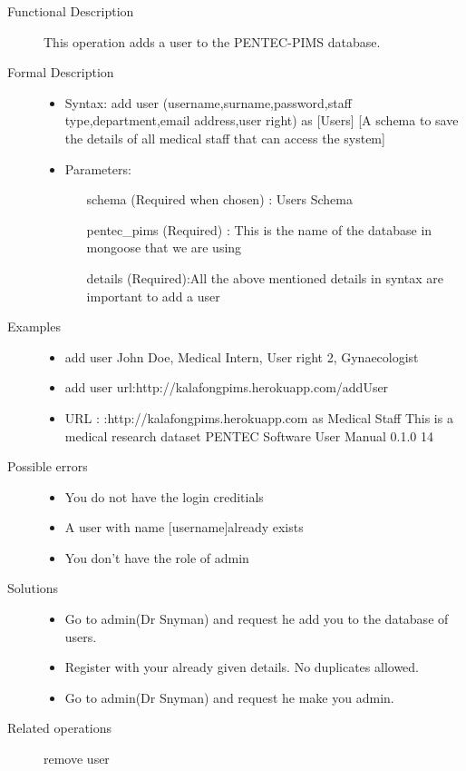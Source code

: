 \documentclass[14pt, a4paper]{article}
\begin{document}
\begin{description}
\item [Functional Description] This operation adds a user to the PENTEC-PIMS database.
\item [Formal Description] \hfill
\begin{itemize}
	\item Syntax: add user (username,surname,password,staff type,department,email address,user right) as [Users] [A schema to save the details of all medical staff that can access the system]\\
	\item Parameters:
		\begin{itemize}
			\item [schema] (Required when chosen) : Users Schema\\
			\item [pentec\_pims] (Required) : This is the name of the database in mongoose that we are using\\
			\item [details](Required):All the above mentioned details in syntax are important to add a user\\
		 \end{itemize}
\end{itemize}
\item[Examples]\hfill
\begin{itemize}
	\item add user John Doe, Medical Intern, User right 2, Gynaecologist
	\item add user url:http://kalafongpims.herokuapp.com/addUser
	\item URL : :http://kalafongpims.herokuapp.com as Medical Staff This is a medical research dataset PENTEC Software User Manual 0.1.0 14
\end{itemize}
\item[Possible errors]\hfill
	\begin{itemize}
	\item You do not have the login creditials
	\item A user with name [username]already exists
	\item You don't have the role of admin
	\end{itemize}
\item[Solutions]\hfill
	\begin{itemize}
	\item Go to admin(Dr Snyman) and request he add you to the database of users.
	\item Register with your already given details. No duplicates allowed.
	\item  Go to admin(Dr Snyman) and request he make you admin.
	\end{itemize}
\item[Related operations] remove user
\end{description}
	  
\end{document}
